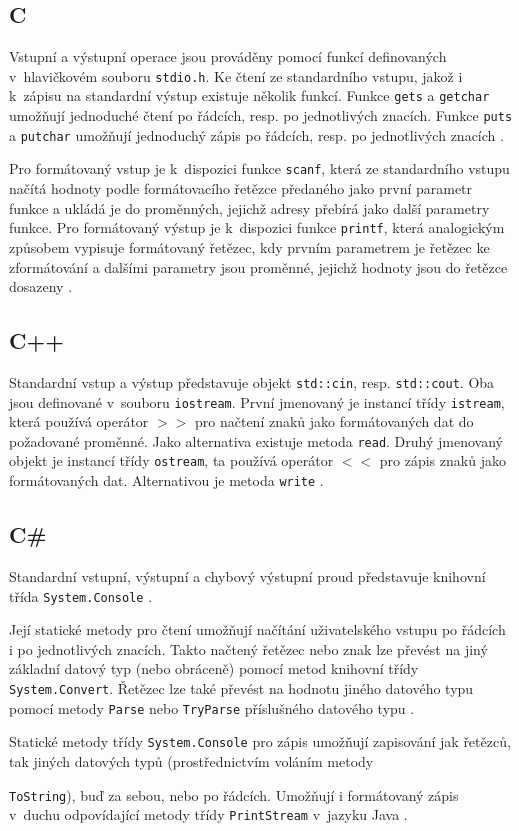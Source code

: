 \documentclass{bakalarka}
\begin{document}
\subsection{C}
Vstupní a výstupní operace jsou prováděny pomocí funkcí definovaných v~hlavičkovém souboru \texttt{stdio.h}. Ke čtení ze standardního vstupu, jakož i k~zápisu na standardní výstup existuje několik funkcí. Funkce \texttt{gets} a \texttt{getchar} umožňují jednoduché čtení po řádcích, resp. po jednotlivých znacích. Funkce \texttt{puts} a \texttt{putchar} umožňují jednoduchý zápis po řádcích, resp. po jednotlivých znacích \cite{cpp-guide-cstdio}.\par
Pro formátovaný vstup je k~dispozici funkce \texttt{scanf}, která ze standardního vstupu načítá hodnoty podle formátovacího řetězce předaného jako první parametr funkce a ukládá je do proměnných, jejichž adresy přebírá jako další parametry funkce. Pro formátovaný výstup je k~dispozici funkce \texttt{printf}, která analogickým způsobem vypisuje formátovaný řetězec, kdy prvním parametrem je řetězec ke zformátování a dalšími parametry jsou proměnné, jejichž hodnoty jsou do řetězce dosazeny \cite{cpp-guide-scanf, cpp-guide-printf}.

\subsection{C++}
Standardní vstup a výstup představuje objekt \texttt{std::cin}, resp. \texttt{std::cout}. Oba jsou definované v~souboru \texttt{iostream}. První jmenovaný je instancí třídy \texttt{istream}, která používá operátor $>>$ pro načtení znaků jako formátovaných dat do požadované proměnné. Jako alternativa existuje metoda \texttt{read}. Druhý jmenovaný objekt je instancí třídy \texttt{ostream}, ta používá operátor $<<$ pro zápis znaků jako formátovaných dat. Alternativou je metoda \texttt{write} \cite{cpp-guide-iostream, cpp-guide-stdcin, cpp-guide-stdcout}.

\subsection{C\#}
Standardní vstupní, výstupní a chybový výstupní proud představuje knihovní třída \texttt{System.Console} \cite{cs-guide-console}.\par 
Její statické metody pro čtení umožňují načítání uživatelského vstupu po řádcích i po jednotlivých znacích. Takto načtený řetězec nebo znak lze převést na jiný základní datový typ (nebo obráceně) pomocí metod knihovní třídy \texttt{System.Convert}. Řetězec lze také převést na hodnotu jiného datového typu pomocí metody \texttt{Parse} nebo \texttt{TryParse} příslušného datového typu \cite{cs-guide-convert, cs-guide-sbyte, cs-guide-short, cs-guide-int, cs-guide-long, cs-guide-float, cs-guide-double, cs-guide-bool, cs-guide-char}.\par
Statické metody třídy \texttt{System.Console} pro zápis umožňují zapisování jak řetězců, tak jiných datových typů (prostřednictvím voláním metody \par\noindent\texttt{ToString}), buď za sebou, nebo po řádcích. Umožňují i formátovaný zápis v~duchu odpovídající metody třídy \texttt{PrintStream} v~jazyku Java \cite{cs-guide-console}.
\end{document}
